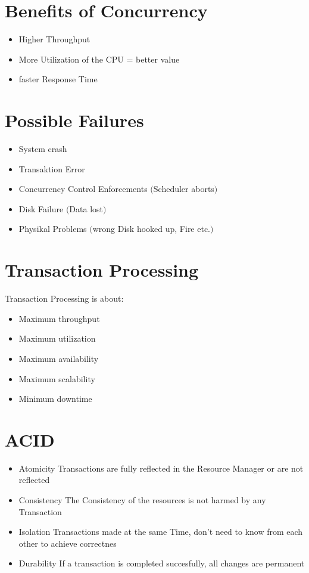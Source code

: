 	\section{Benefits of Concurrency}
		\begin{itemize}
			\item Higher Throughput
			\item More Utilization of the CPU = better value
			\item faster Response Time
		\end{itemize}
		
	\section{Possible Failures}
		\begin{itemize}
			\item System crash
			\item Transaktion Error
			\item Concurrency Control Enforcements $($Scheduler aborts$)$
			\item Disk Failure $($Data lost$)$
			\item Physikal Problems $($wrong Disk hooked up, Fire etc.$)$ 
		\end{itemize}
		
	
	\section{Transaction Processing}
		Transaction Processing is about:
		\begin{itemize}
			\item Maximum throughput
			\item Maximum utilization
			\item Maximum availability 
			\item Maximum scalability
			\item Minimum downtime
		\end{itemize}
	
	\section{ACID}
		\begin{itemize}
			\item Atomicity
				\subitem Transactions are fully reflected in the Resource Manager or are not reflected
			\item Consistency
				\subitem The Consistency of the resources is not harmed by any Transaction
			\item Isolation
				\subitem Transactions made at the same Time, don't need to know from each other to achieve correctnes
			\item Durability
				\subitem If a transaction is completed succesfully, all changes are permanent
		\end{itemize}
	
